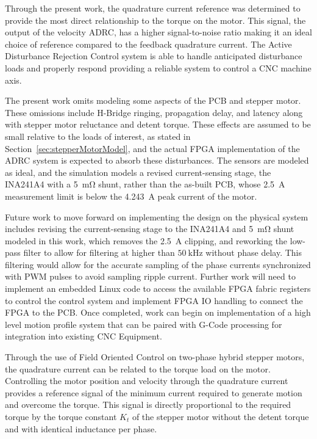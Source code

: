 Through the present work, the quadrature current reference was determined to provide the most direct relationship to the torque on the motor. This signal, the output of the velocity ADRC, has a higher signal-to-noise ratio making it an ideal choice of reference compared to the feedback quadrature current. The Active Disturbance Rejection Control system is able to handle anticipated disturbance loads and properly respond providing a reliable system to control a CNC machine axis. 


The present work omits modeling some aspects of the PCB and stepper motor. These omissions include H-Bridge ringing, propagation delay, and latency along with stepper motor reluctance and detent torque. These effects are assumed to be small relative to the loads of interest, as stated in Section~\ref{sec:stepperMotorModel}, and the actual FPGA implementation of the ADRC system is expected to absorb these disturbances. The sensors are modeled as ideal, and the simulation models a revised current-sensing stage, the INA241A4 with a \SI{5}{\milli\ohm} shunt, rather than the as-built PCB, whose \SI{2.5}{\ampere} measurement limit is below the \SI{4.243}{\ampere} peak current of the motor.


Future work to move forward on implementing the design on the physical system includes revising the current-sensing stage to the INA241A4 and \SI{5}{\milli\ohm} shunt modeled in this work, which removes the \SI{2.5}{\ampere} clipping, and reworking the low-pass filter to allow for filtering at higher than $\SI{50}{\kilo\hertz}$ without phase delay. This filtering would allow for the accurate sampling of the phase currents synchronized with PWM pulses to avoid sampling ripple current. Further work will need to implement an embedded Linux code to access the available FPGA fabric registers to control the control system and implement FPGA IO handling to connect the FPGA to the PCB. Once completed, work can begin on implementation of a high level motion profile system that can be paired with G-Code processing for integration into existing CNC Equipment. 


Through the use of Field Oriented Control on two-phase hybrid stepper motors, the quadrature current can be related to the torque load on the motor. Controlling the motor position and velocity through the quadrature current provides a reference signal of the minimum current required to generate motion and overcome the torque. This signal is directly proportional to the required torque by the torque constant $K_t$ of the stepper motor without the detent torque and with identical inductance per phase. 